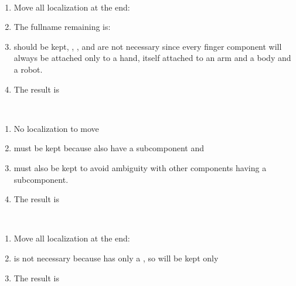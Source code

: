 \begin{example}~\\
  \begin{enumerate}
  \item Move all localization at the end:
  \item The fullname remaining is: 
  \item {} should be kept, , ,
     and  are not necessary since every
    finger component will always be attached only to a hand, itself
    attached to an arm and a body and a robot.
  \item The result is 
  \end{enumerate}
\end{example}


\begin{example}~\\
  \begin{enumerate}
  \item No localization to move
  \item {} must be kept because  also have a
     subcomponent and
  \item {} must also be kept to avoid ambiguity with other
    components having a  subcomponent.
  \item The result is 
  \end{enumerate}
\end{example}

\begin{example}~\\
  \begin{enumerate}
  \item Move all localization at the end:
  \item {} is not necessary because  has only a
    , so  will be kept only
  \item The result is 
  \end{enumerate}
\end{example}


